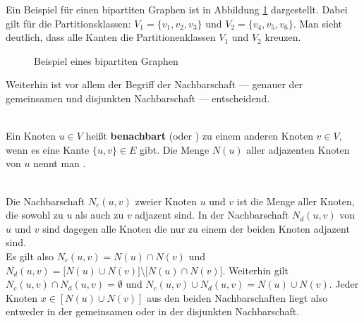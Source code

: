 Ein Beispiel für einen bipartiten Graphen ist in Abbildung \ref{fig:beispiel_bipartit} dargestellt. Dabei gilt für die Partitionsklassen:
$V_1 = \{v_1,v_2,v_3\}$ und $V_2 = \{v_{4},v_5,v_6\}$. Man sieht deutlich, dass alle Kanten die Partitionenklassen
$V_1$ und $V_2$ \glqq kreuzen\grqq.
\begin{figure}
\centering
{}
\caption{Beispiel eines bipartiten Graphen}
\label{fig:beispiel_bipartit}
\end{figure}
Weiterhin ist vor allem der Begriff der Nachbarschaft --- genauer der gemeinsamen und disjunkten 
Nachbarschaft --- entscheidend.
\begin{definition}[Nachbarschaft]~\\
Ein Knoten $u \in V$ heißt \textbf{benachbart} (oder ) zu einem 
anderen Knoten $v \in V$, wenn es eine Kante $\{u,v\} \in E $ gibt. Die Menge $N(u)$ aller adjazenten Knoten
von $u$ nennt man .
\end{definition}
\begin{definition}~\\
Die  Nachbarschaft $N_{c}(u,v)$ zweier Knoten $u$ und $v$ ist die Menge aller Knoten, die sowohl
zu $u$ als auch zu $v$ adjazent sind. In der  Nachbarschaft $N_{d}(u,v)$ von $u$ und $v$ sind dagegen 
alle Knoten die nur zu einem der beiden Knoten adjazent sind. \\
Es gilt also $N_{c}(u,v) = N(u) \cap N(v)$ und $N_{d}(u,v) = \big[N(u) \cup N(v)\big]\setminus \big[N(u) \cap N(v) \big]$.{}
Weiterhin gilt $N_{c}(u,v) \cap N_{d}(u,v) = \emptyset$ und $N_{c}(u,v) \cup N_{d}(u,v) = N(u) \cup N(v)$.
Jeder Knoten $x\in \left[N(u) \cup N(v)\right]$ aus den beiden Nachbarschaften liegt also entweder
in der gemeinsamen oder in der disjunkten Nachbarschaft.
\label{def:common_disjoint}
\end{definition}

